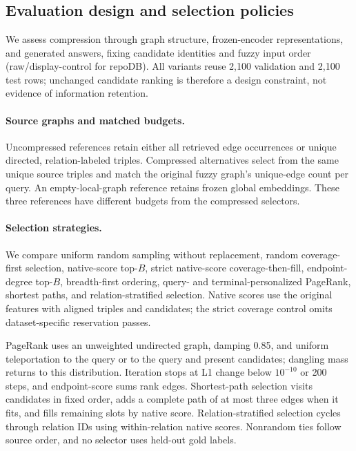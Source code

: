 \section{}
\label{sec:s13-retention}
\begin{revisionblock}
\subsection{Evaluation design and selection policies}
We assess compression through graph structure, frozen-encoder representations, and generated answers, fixing candidate identities and fuzzy input order (raw/display-control for repoDB). All variants reuse 2,100 validation and 2,100 test rows; unchanged candidate ranking is therefore a design constraint, not evidence of information retention.

\paragraph{Source graphs and matched budgets.}
Uncompressed references retain either all retrieved edge occurrences or unique directed, relation-labeled triples. Compressed alternatives select from the same unique source triples and match the original fuzzy graph's unique-edge count per query. An empty-local-graph reference retains frozen global embeddings. These three references have different budgets from the compressed selectors.

\paragraph{Selection strategies.}
We compare uniform random sampling without replacement, random coverage-first selection, native-score top-$B$, strict native-score coverage-then-fill, endpoint-degree top-$B$, breadth-first ordering, query- and terminal-personalized PageRank, shortest paths, and relation-stratified selection. Native scores use the original features with aligned triples and candidates; the strict coverage control omits dataset-specific reservation passes.

PageRank uses an unweighted undirected graph, damping 0.85, and uniform teleportation to the query or to the query and present candidates; dangling mass returns to this distribution. Iteration stops at L1 change below $10^{-10}$ or 200 steps, and endpoint-score sums rank edges. Shortest-path selection visits candidates in fixed order, adds a complete path of at most three edges when it fits, and fills remaining slots by native score. Relation-stratified selection cycles through relation IDs using within-relation native scores. Nonrandom ties follow source order, and no selector uses held-out gold labels.


\end{revisionblock}
